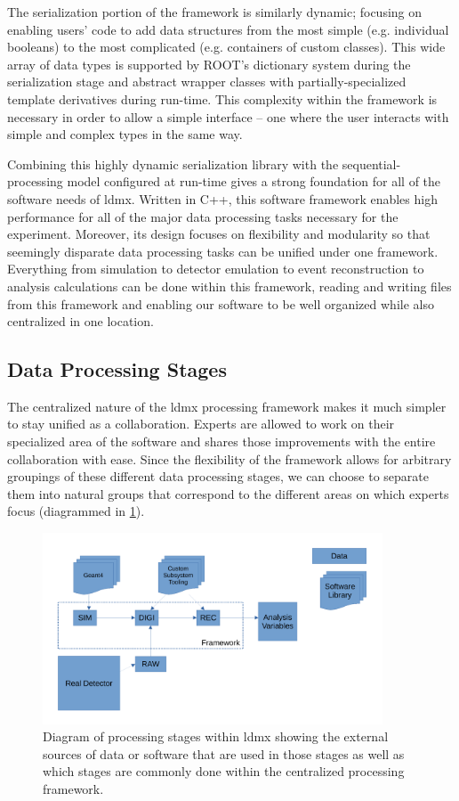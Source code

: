 The serialization portion of the framework is similarly dynamic; focusing on enabling users' code
to add data structures from the most simple (e.g. individual booleans) to the most complicated
(e.g. containers of custom classes). This wide array of data types is supported by ROOT's
dictionary system during the serialization stage and abstract wrapper classes with
partially-specialized template derivatives during run-time. This complexity within the framework is
necessary in order to allow a simple interface -- one where the user interacts with simple and
complex types in the same way.

Combining this highly dynamic serialization library with the sequential-processing model configured
at run-time gives a strong foundation for all of the software needs of \ac{ldmx}. Written in C++,
this software framework enables high performance for all of the major data processing tasks
necessary for the experiment. Moreover, its design focuses on flexibility and modularity so that
seemingly disparate data processing tasks can be unified under one framework. Everything from
simulation to detector emulation to event reconstruction to analysis calculations can be done
within this framework, reading and writing files from this framework and enabling our software to
be well organized while also centralized in one location.

\subsection{Data Processing Stages}
The centralized nature of the \ac{ldmx} processing framework makes it much simpler to stay unified
as a collaboration. Experts are allowed to work on their specialized area of the software and
shares those improvements with the entire collaboration with ease. Since the flexibility of the
framework allows for arbitrary groupings of these different data processing stages, we can choose
to separate them into natural groups that correspond to the different areas on which experts focus
(diagrammed in \cref{fig:ldmx:sim:data-stages}).

\begin{figure}
  \centering
  \includegraphics[width=0.9\textwidth]{figures/ldmx/simulation/data-flow.pdf}
  \caption{Diagram of processing stages within \ac{ldmx} showing the external sources of data or software that are used in those stages as well as which stages are commonly done within the centralized processing framework.}
  \label{fig:ldmx:sim:data-stages}
\end{figure}

